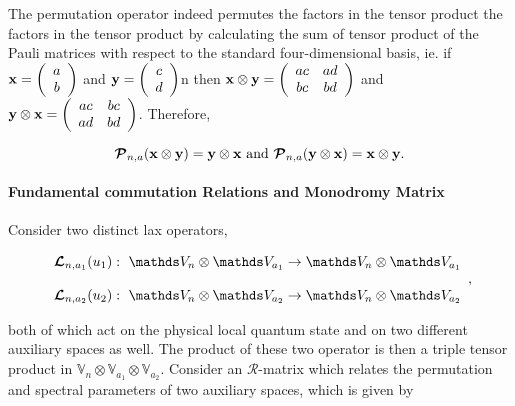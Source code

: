 \documentclass{homework}
\begin{document}
The permutation operator indeed permutes the factors in the tensor product the factors in the tensor product by calculating the sum of tensor product of the Pauli matrices with respect to the standard four-dimensional basis, ie. if ${\bf x} = \left(\begin{array}{c}
     a \\
     b 
\end{array}\right)$ and ${\bf y} = \left(\begin{array}{c}
     c \\
     d 
\end{array}\right)$n then ${\bf x} \otimes {\bf y} = \left( \begin{array}{cc}
    ac & ad  \\
    bc & bd 
\end{array} \right)$ and  ${\bf y} \otimes {\bf x} = \left( \begin{array}{cc}
    ac & bc  \\
    ad & bd 
\end{array} \right)$. Therefore,

\begin{equation}
    \bm{\mathcal{P}}_{n, a} ({\bf x} \otimes {\bf y} ) = {\bf y} \otimes {\bf x} \textnormal{ and } \bm{\mathcal{P}}_{n, a} ( {\bf y} \otimes {\bf x}) = {\bf x} \otimes {\bf y}.
\end{equation}

\paragraph{\textbf{Fundamental commutation Relations and Monodromy Matrix}}

Consider two distinct lax operators,

\begin{equation*}
    \begin{array}{c}
        \bl_{n, a_1}(u_1): \blanky \vds_n \otimes \vds_{a_1} \rightarrow \vds_n \otimes \vds_{a_1}  \\
        \\
        \bl_{n, a_2}(u_2): \blanky \vds_n \otimes \vds_{a_2} \rightarrow \vds_n \otimes \vds_{a_2} 
    \end{array},
\end{equation*}

both of which act on the physical local quantum state and on two different auxiliary spaces as well. The product of these two operator is then a triple tensor product in $\mathds{V}_{n} \otimes \mathds{V}_{a_1} \otimes \mathds{V}_{a_2}$. Consider an $\bm{\mathcal{R}}$-matrix which relates the permutation and spectral parameters of two auxiliary spaces, which is given by  
\end{document}
